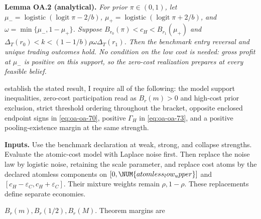 \protect{}\label{result-lemma-oa-2}{\textbf{Lemma OA.2
(analytical).}} \emph{For prior \(\pi\in(0,1)\), let
\(\mu_-=\operatorname{logistic}(\operatorname{logit}\pi-2/b)\),
\(\mu_+=\operatorname{logistic}(\operatorname{logit}\pi+2/b)\), and
\(\omega=\min\{\mu_-,1-\mu_+\}\). Suppose
\(B_{r_0}(\pi)<c_H<B_{r_1}(\mu_+)\) and
\(\Delta_T(r_0)<k<(1-1/b)\rho\omega\Delta_T(r_1)\). Then the benchmark
entry reversal and unique trading outcomes hold. No condition on the low cost
is needed: gross profit at \(\mu_-\) is positive on this support, so the
zero-cost realization prepares at every feasible belief.}

establish the stated result, I require all of the following: the model
support inequalities, zero-cost participation read as \(B_r(m)>0\) and high-cost prior
exclusion, strict threshold ordering throughout the bracket, opposite
enclosed endpoint signs in \eqref{eq:oa-oa-70}, positive \(\Gamma_H\) in
\eqref{eq:oa-oa-73}, and a positive pooling-existence margin at the same
strength.

\textbf{Inputs.} Use the benchmark declaration at weak, strong, and
collapse strengths. Evaluate the atomic-cost model with Laplace noise
first. Then replace the noise law by logistic noise, retaining the scale
parameter, and replace cost atoms by the declared atomless components on
\([0,\NUM{atomless_low_upper}]\) and
\([c_H-\varepsilon_C,c_H+\varepsilon_C]\). Their mixture weights remain
\(\rho,1-\rho\). These replacements define separate economies.

\(B_r(m),B_r(1/2),B_r(M)\). Theorem margins are

